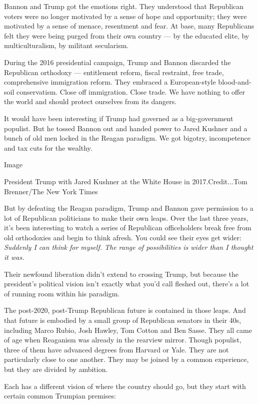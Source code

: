 Bannon and Trump got the emotions right. They understood that Republican
voters were no longer motivated by a sense of hope and opportunity; they
were motivated by a sense of menace, resentment and fear. At base, many
Republicans felt they were being purged from their own country --- by
the educated elite, by multiculturalism, by militant secularism.

During the 2016 presidential campaign, Trump and Bannon discarded the
Republican orthodoxy --- entitlement reform, fiscal restraint, free
trade, comprehensive immigration reform. They embraced a European-style
blood-and-soil conservatism. Close off immigration. Close trade. We have
nothing to offer the world and should protect ourselves from its
dangers.

It would have been interesting if Trump had governed as a big-government
populist. But he tossed Bannon out and handed power to Jared Kushner and
a bunch of old men locked in the Reagan paradigm. We got bigotry,
incompetence and tax cuts for the wealthy.

Image

President Trump with Jared Kushner at the White House in
2017.Credit...Tom Brenner/The New York Times

But by defeating the Reagan paradigm, Trump and Bannon gave permission
to a lot of Republican politicians to make their own leaps. Over the
last three years, it's been interesting to watch a series of Republican
officeholders break free from old orthodoxies and begin to think afresh.
You could see their eyes get wider: \emph{Suddenly I can think for
myself. The range of possibilities is wider than I thought it was.}

Their newfound liberation didn't extend to crossing Trump, but because
the president's political vision isn't exactly what you'd call fleshed
out, there's a lot of running room within his paradigm.

The post-2020, post-Trump Republican future is contained in those leaps.
And that future is embodied by a small group of Republican senators in
their 40s, including Marco Rubio, Josh Hawley, Tom Cotton and Ben Sasse.
They all came of age when Reaganism was already in the rearview mirror.
Though populist, three of them have advanced degrees from Harvard or
Yale. They are not particularly close to one another. They may be joined
by a common experience, but they are divided by ambition.

Each has a different vision of where the country should go, but they
start with certain common Trumpian premises:

